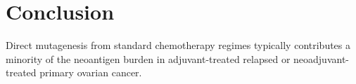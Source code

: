 \section*{Conclusion}
Direct mutagenesis from standard chemotherapy regimes typically contributes a minority of the neoantigen burden in adjuvant-treated relapsed or neoadjuvant-treated primary ovarian cancer.
